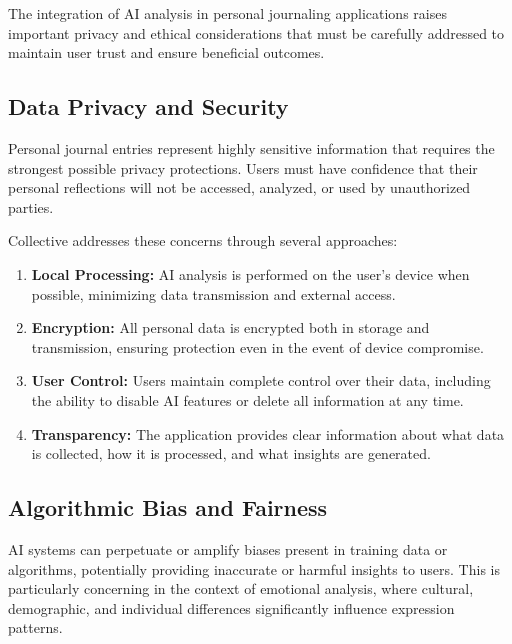The integration of AI analysis in personal journaling applications raises important privacy and ethical considerations that must be carefully addressed to maintain user trust and ensure beneficial outcomes.

\subsection{Data Privacy and Security}\label{subsec:privacy}

Personal journal entries represent highly sensitive information that requires the strongest possible privacy protections. Users must have confidence that their personal reflections will not be accessed, analyzed, or used by unauthorized parties.

Collective addresses these concerns through several approaches:

\begin{enumerate}
    \item \textbf{Local Processing:} AI analysis is performed on the user's device when possible, minimizing data transmission and external access.
    
    \item \textbf{Encryption:} All personal data is encrypted both in storage and transmission, ensuring protection even in the event of device compromise.
    
    \item \textbf{User Control:} Users maintain complete control over their data, including the ability to disable AI features or delete all information at any time.
    
    \item \textbf{Transparency:} The application provides clear information about what data is collected, how it is processed, and what insights are generated.
\end{enumerate}

\subsection{Algorithmic Bias and Fairness}\label{subsec:bias}

AI systems can perpetuate or amplify biases present in training data or algorithms, potentially providing inaccurate or harmful insights to users. This is particularly concerning in the context of emotional analysis, where cultural, demographic, and individual differences significantly influence expression patterns.


